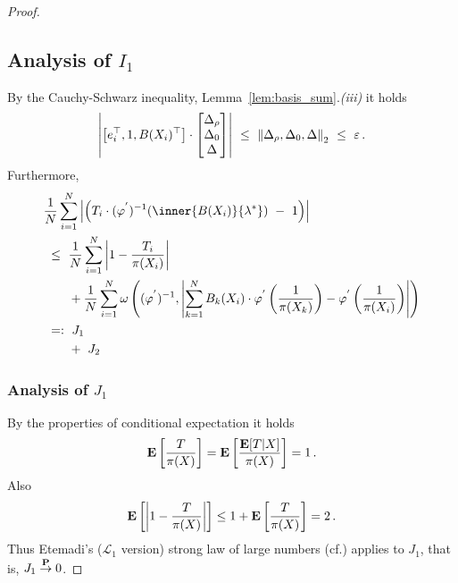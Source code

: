 \begin{proof}
\subsection*{Analysis of $I_1$}
By the Cauchy-Schwarz inequality, Lemma~\ref{lem:basis_sum}.\textit{(iii)} it holds
\begin{align*}
  \left|
   \left[ 
    e_i^\top,1,B(X_i)^\top
  \right]
  \cdot
  \begin{bmatrix}
    \Delta_\rho\\\Delta_0\\\Delta
    \end{bmatrix}
  \right|
  \ 
  \le
  \ 
  \norm{
    \Delta_\rho,\Delta_0,\Delta
  }_2
  \ 
  \le
  \ 
  \varepsilon
  \,.
\end{align*}
Furthermore,
\begin{align*}
  &
    \frac{1}{N}
\sum_{i=1} 
  ^N
  \left|
   \left( 
     T_i\cdot
  (
  \varphi^{'}
  )
  ^{-1}
  \!
  \left( 
\inner
{B(X_i)}
{
\lambda^*
}
  \right)
  \ 
  -
  \ 
  1
  \right)
  \right|
  \\
  &
  \ 
  \le
  \ 
    \frac{1}{N}
\sum_{i=1} 
^{N}
\left|
  1-
  \frac
  {T_i}
  {\pi(X_i)}
\right|
\\
&
\qquad
+
    \frac{1}{N}
    \sum_{i=1}^{N} 
\omega
\left(
  (
  \varphi^{'}
  )
  ^{-1}
  ,
  \left|
    \sum_{k=1}^{N}
  B_k(X_i)
  \cdot
  \varphi^{'}
  \left(
    \frac
    {1}
    {\pi(X_k)}
  \right)
  -
  \varphi^{'}
  \left(
    \frac
    {1}
    {\pi(X_i)}
  \right)
  \right|
  \right)
  \\
  &
  \ 
  =:
  \ 
  J_1
  \\
  &
  \qquad
  +
  \ 
  J_2
\end{align*}
\subsubsection*{Analysis of $J_1$}
By the properties of conditional expectation it holds
\begin{gather*}
  \E
  \left[ 
    \frac{T}{\pi(X)}
  \right]
  =
  \E
  \left[ 
    \frac{\E[T|X]}{\pi(X)}
  \right]
  =1
  \,.
\end{gather*}
Also
\begin{gather}
  \E
  \left[ 
    \left| 
    1
    -
    \frac{T}{\pi(X)}
    \right|
  \right]
  \le
  1
  +
  \E
  \left[ 
    \frac{T}{\pi(X)}
  \right]
  =
  2
  \,.
\end{gather}
Thus Etemadi's ($\mathcal{L}_1$ version) strong law of large numbers (cf.\cite[Theorem~5.17]{Klenke2020}) applies
to $J_1$, that is,
$J_1\overset{\P}{\to}0$.

\end{proof}
